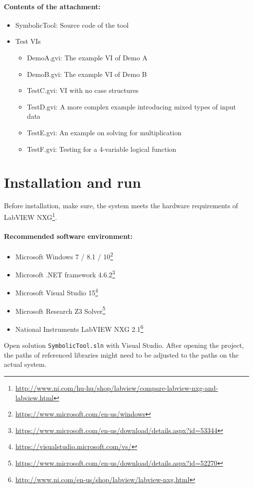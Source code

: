\paragraph{Contents of the attachment:}
\begin{itemize}
\item SymbolicTool: Source code of the tool
\item Test VIs

\begin{itemize}
\item Demo\textunderscore A.gvi: The example VI of Demo A
\item Demo\textunderscore B.gvi: The example VI of Demo B
\item Test\textunderscore C.gvi: VI with no case structures
\item Test\textunderscore D.gvi: A more complex example introducing mixed types of input data
\item Test\textunderscore E.gvi: An example on solving for multiplication
\item Test\textunderscore F.gvi: Testing for a 4-variable logical function

\end{itemize}
\end{itemize}
\section{Installation and run}

Before installation, make sure, the system meets the hardware requirements of LabVIEW NXG\footnote{\url{http://www.ni.com/hu-hu/shop/labview/compare-labview-nxg-and-labview.html}}.
\paragraph{Recommended software environment:}
\begin{itemize}
\item Microsoft Windows 7 / 8.1 / 10\footnote{\url{https://www.microsoft.com/en-us/windows}}
\item Microsoft .NET framework 4.6.2\footnote{\url{https://www.microsoft.com/en-us/download/details.aspx?id=53344}}
\item Microsoft Visual Studio 15\footnote{\url{https://visualstudio.microsoft.com/vs/}}
\item Microsoft Research Z3 Solver\footnote{\url{https://www.microsoft.com/en-us/download/details.aspx?id=52270}}
\item National Instruments LabVIEW NXG 2.1\footnote{\url{http://www.ni.com/en-us/shop/labview/labview-nxg.html}}
\end{itemize}
Open solution \verb|SymbolicTool.sln| with Visual Studio. After opening the project, the paths of referenced libraries might need to be adjusted to the paths on the actual system. 

